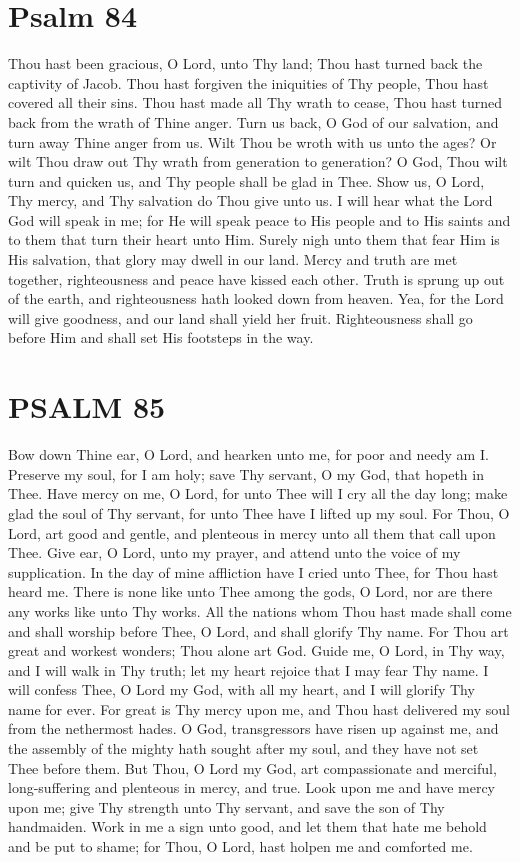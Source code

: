 {\section*{Psalm 84}
Thou hast been gracious, O Lord, unto Thy land;
Thou hast turned back the captivity of 
Jacob. 
Thou hast forgiven the iniquities of Thy people,
Thou hast covered all their sins. 
Thou hast made all Thy wrath to cease,
Thou hast turned back from the wrath of Thine 
anger. 
Turn us back, O God of our salvation, and turn away Thine anger from us. 
Wilt Thou be wroth with us unto the ages? Or wilt Thou draw out Thy wrath from 
generation to generation? 
O God, Thou wilt turn and quicken us, and Thy people shall be glad in Thee. 
Show us, O Lord, Thy mercy, and Thy salvation do Thou give unto us. 
I will hear what the Lord God will speak in me;
for He will speak peace to His people 
and to His saints and to them that turn their heart unto Him. 
Surely nigh unto them that fear Him is His salvation,
that glory may dwell in our land. 
Mercy and truth are met together,
righteousness and peace have kissed each other. 
Truth is sprung up out of the earth,
and righteousness hath looked down from heaven. 
Yea, for the Lord will give goodness, and our land shall yield her fruit. 
Righteousness shall go before Him and shall set His footsteps in the way. 

\section*{PSALM 85}
Bow down Thine ear, O Lord, and hearken unto me, for poor and needy am I. 
Preserve my soul, for I am holy;
save Thy servant, O my God, that hopeth in Thee. 
Have mercy on me, O Lord, for unto Thee will I cry all the day long;
make glad the soul 
of Thy servant, for unto Thee have I lifted up my soul. 
For Thou, O Lord, art good and gentle,
and plenteous in mercy unto all them that call 
upon Thee. 
Give ear, O Lord, unto my prayer,
and attend unto the voice of my supplication. 
In the day of mine affliction have I cried unto Thee, for Thou hast heard me. 
There is none like unto Thee among the gods, O Lord,
nor are there any works like unto 
Thy works. 
All the nations whom Thou hast made shall come and shall worship before Thee,
O Lord, 
and shall glorify Thy name. 
For Thou art great and workest wonders; Thou alone art God. 
Guide me, O Lord, in Thy way, and I will walk in Thy truth;
let my heart rejoice that I 
may fear Thy name. 
I will confess Thee, O Lord my God, with all my heart,
and I will glorify Thy name for ever. 
For great is Thy mercy upon me,
and Thou hast delivered my soul from the nethermost hades. 
O God, transgressors have risen up against me,
and the assembly of the mighty hath 
sought after my soul, and they have not set Thee before them. 
But Thou, O Lord my God, art compassionate and merciful,
long-suffering and plenteous in mercy, and true. 
Look upon me and have mercy upon me;
give Thy strength unto Thy servant, and save the son of Thy handmaiden. 
Work in me a sign unto good,
and let them that hate me behold and be put to shame;
for Thou, O Lord, hast holpen me and comforted me. 

}

